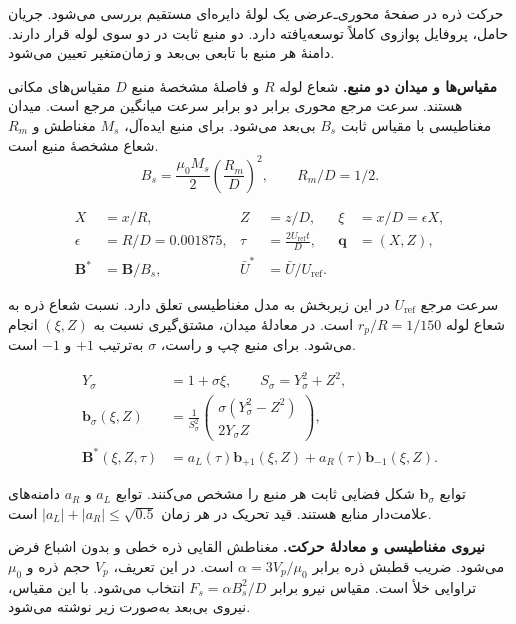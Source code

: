\label{sec:forward-magnetic-operator}

حرکت ذره در صفحهٔ محوری‌ـ‌عرضی یک لولهٔ دایره‌ای مستقیم بررسی می‌شود.
جریان حامل، پروفایل پوازوی کاملاً توسعه‌یافته دارد.
دو منبع ثابت در دو سوی لوله قرار دارند.
دامنهٔ هر منبع با تابعی بی‌بعد و زمان‌متغیر تعیین می‌شود.

\textbf{مقیاس‌ها و میدان دو منبع.}
شعاع لوله $R$ و فاصلهٔ مشخصهٔ منبع $D$ مقیاس‌های مکانی هستند.
سرعت مرجع محوری برابر دو برابر سرعت میانگین مرجع است.
میدان مغناطیسی با مقیاس ثابت $B_s$ بی‌بعد می‌شود.
برای منبع ایده‌آل، $M_s$ مغناطش و $R_m$ شعاع مشخصهٔ منبع است.
\[
B_s=\frac{\mu_0 M_s}{2}\left(\frac{R_m}{D}\right)^2,
\qquad R_m/D=1/2.
\]

\begin{equation}
\begin{aligned}
X&=x/R,& Z&=z/D,& \xi&=x/D=\epsilon X,\\
\epsilon&=R/D=0.001875,&
\tau&=\frac{2U_{\mathrm{ref}}t}{D},&
\mathbf q&=(X,Z),\\
\mathbf B^*&=\mathbf B/B_s,&
\bar U^*&=\bar U/U_{\mathrm{ref}}.
\end{aligned}
\label{eq:forward-mag-scales}
\end{equation}

سرعت مرجع $U_{\mathrm{ref}}$ در این زیربخش به مدل مغناطیسی تعلق دارد.
نسبت شعاع ذره به شعاع لوله $r_p/R=1/150$ است.
در معادلهٔ میدان، مشتق‌گیری نسبت به $(\xi,Z)$ انجام می‌شود.
برای منبع چپ و راست، $\sigma$ به‌ترتیب $+1$ و $-1$ است.

\begin{equation}
\begin{aligned}
Y_\sigma&=1+\sigma\xi,\qquad
S_\sigma=Y_\sigma^2+Z^2,\\
\mathbf b_\sigma(\xi,Z)&=
\frac{1}{S_\sigma^2}
\begin{pmatrix}
\sigma(Y_\sigma^2-Z^2)\\[2pt] 2Y_\sigma Z
\end{pmatrix},\\
\mathbf B^*(\xi,Z,\tau)&=
 a_L(\tau)\mathbf b_{+1}(\xi,Z)+a_R(\tau)\mathbf b_{-1}(\xi,Z).
\end{aligned}
\label{eq:forward-mag-field}
\end{equation}

توابع $\mathbf b_\sigma$ شکل فضایی ثابت هر منبع را مشخص می‌کنند.
توابع $a_L$ و $a_R$ دامنه‌های علامت‌دار منابع هستند.
قید تحریک در هر زمان $|a_L|+|a_R|\le\sqrt{0.5}$ است.

\textbf{نیروی مغناطیسی و معادلهٔ حرکت.}
مغناطش القایی ذره خطی و بدون اشباع فرض می‌شود.
ضریب قطبش ذره برابر $\alpha=3V_p/\mu_0$ است.
در این تعریف، $V_p$ حجم ذره و $\mu_0$ تراوایی خلأ است.
مقیاس نیرو برابر $F_s=\alpha B_s^2/D$ انتخاب می‌شود.
با این مقیاس، نیروی بی‌بعد به‌صورت زیر نوشته می‌شود.

